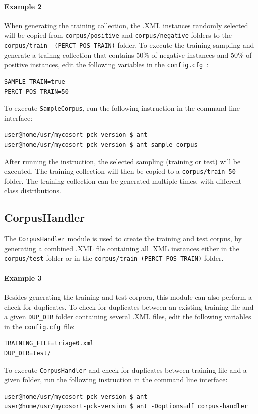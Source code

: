 \documentclass[11pt]{article}
\newcommand{\configfile}{\texttt{config.cfg{ }}}
\begin{document}
\paragraph{Example 2}
When generating the training collection, the .XML instances randomly selected will be 
copied from \texttt{corpus/positive} and \texttt{corpus/negative} folders to the 
\texttt{corpus/train\_ (PERCT\_POS\_TRAIN)} folder.
To execute the training sampling and generate a trainng collection that contains
50\% of negative instances and 50\% of positive instances,
edit the following variables in the \configfile:
\begin{lstlisting}
SAMPLE_TRAIN=true
PERCT_POS_TRAIN=50
\end{lstlisting}

To execute \texttt{SampleCorpus}, run the following instruction in the command line interface:
\begin{lstlisting}
user@home/usr/mycosort-pck-version $ ant
user@home/usr/mycosort-pck-version $ ant sample-corpus
\end{lstlisting}
After running the instruction, the selected sampling (training or test) will be executed.
The training collection will then be copied to a \texttt{corpus/train\_50} folder.
The training collection can be generated multiple times, with different class distributions.

\subsection{CorpusHandler}
The \texttt{CorpusHandler} module is used to create the training and test corpus,
by generating a combined .XML file containing all .XML instances either in the 
\texttt{corpus/test} folder or in the \texttt{corpus/train\_(PERCT\_POS\_TRAIN)} folder.
\paragraph{Example 3}
Besides generating the training and test corpora, this module can also perform a check for duplicates.
To check for duplicates between an existing training file 
and a given \texttt{DUP\_DIR} folder containing several .XML files, 
edit the following variables in the \configfile file:
\begin{lstlisting}
TRAINING_FILE=triage0.xml
DUP_DIR=test/
\end{lstlisting}
To execute \texttt{CorpusHandler} and check for duplicates between training file and a given folder,
run the following instruction in the command line interface:
\begin{lstlisting}
user@home/usr/mycosort-pck-version $ ant
user@home/usr/mycosort-pck-version $ ant -Doptions=df corpus-handler
\end{lstlisting}
\end{document}

